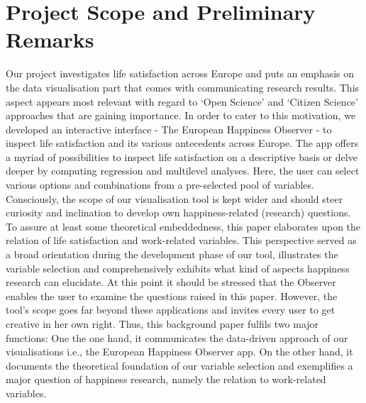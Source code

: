 \documentclass[preprint,12pt,authoryear]{elsarticle}
\begin{document}
	\newpage
	\tableofcontents
	\newpage
	
	
	\section{Project Scope and Preliminary Remarks}
	Our project investigates life satisfaction across Europe and puts an emphasis on the data visualisation part that comes
	with communicating research results. This aspect appears most relevant with regard to `Open Science' and `Citizen
	Science' approaches that are gaining importance. In order to cater to this motivation, we developed an interactive interface
	- The European Happiness Observer - to inspect life satisfaction and its various antecedents across Europe. The app offers
	a myriad of possibilities to inspect life satisfaction on a descriptive basis or delve deeper by computing regression and multilevel
	analyses. Here, the user can select various options and combinations from a pre-selected pool of variables. \\
	Consciously, the scope of our visualisation tool is kept wider and should steer curiosity and inclination to develop own 
	happiness-related (research) questions. To assure at least some theoretical embeddedness, this paper elaborates upon the
	relation of life satisfaction and work-related variables. This perspective served as a broad orientation during the development
	phase of our tool, illustrates the variable selection and comprehensively exhibits what kind of aspects happiness research
	can elucidate. At this point it should be stressed that the Observer enables the user to examine the questions raised in this
	paper. However, the tool's scope goes far beyond these applications and invites every user to get creative in her own 
	right. Thus, this background paper fulfils two major functions: One the one hand, it communicates the data-driven
	approach of our visualisations i.e., the European Happiness Observer app. On the other hand, it documents the theoretical foundation
	of our variable selection and exemplifies a major question of happiness research, namely the relation to work-related
	variables.  
	
\end{document}
